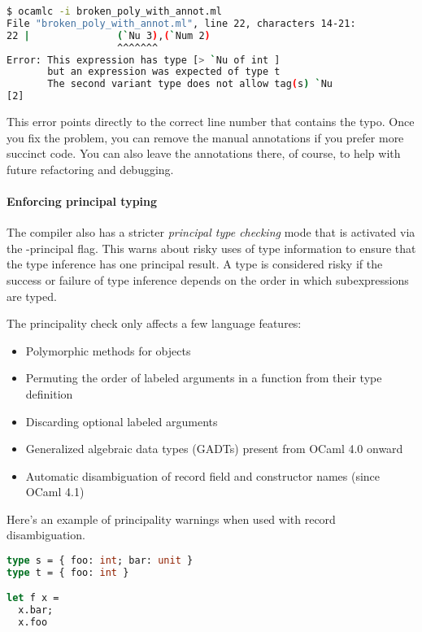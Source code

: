 \begin{lstlisting}[language=bash]
$ ocamlc -i broken_poly_with_annot.ml
File "broken_poly_with_annot.ml", line 22, characters 14-21:
22 |               (`Nu 3),(`Num 2)
                   ^^^^^^^
Error: This expression has type [> `Nu of int ]
       but an expression was expected of type t
       The second variant type does not allow tag(s) `Nu
[2]
\end{lstlisting}

This error points directly to the correct line number that contains the
typo. Once you fix the problem, you can remove the manual annotations if
you prefer more succinct code. You can also leave the annotations there,
of course, to help with future refactoring and debugging.

\hypertarget{enforcing-principal-typing}{%
\paragraph{Enforcing principal
typing}\label{enforcing-principal-typing}}

The compiler also has a stricter \emph{principal type checking} mode
that is activated via the {-principal} flag. This warns about risky uses
of type information to ensure that the type inference has one principal
result. A type is considered risky if the success or failure of type
inference depends on the order in which subexpressions are
typed.

The principality check only affects a few language features:

\begin{itemize}
\item
  Polymorphic methods for objects
\item
  Permuting the order of labeled arguments in a function from their type
  definition
\item
  Discarding optional labeled arguments
\item
  Generalized algebraic data types (GADTs) present from OCaml 4.0 onward
\item
  Automatic disambiguation of record field and constructor names (since
  OCaml 4.1)
\end{itemize}

Here's an example of principality warnings when used with record
disambiguation.

\begin{lstlisting}[language=Caml]
type s = { foo: int; bar: unit }
type t = { foo: int }

let f x =
  x.bar;
  x.foo
\end{lstlisting}

